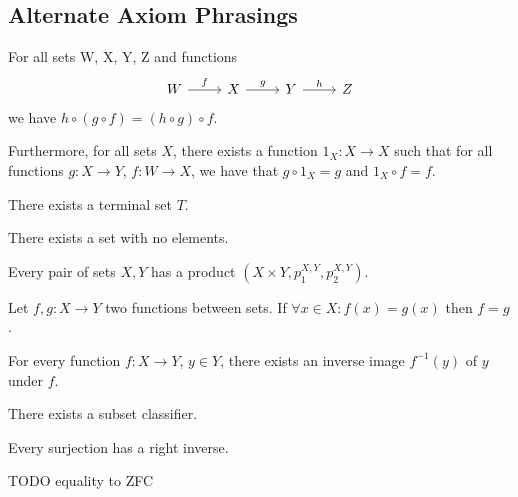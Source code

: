 \begin{appendix}

\section{Alternate Axiom Phrasings}

\setcounter{axiom}{0}


\begin{axiom}
For all sets W, X, Y, Z and functions
\begin{equation*}
\begin{tikzcd}
W \arrow[r,"f"] & X \arrow[r,"g"] & Y \arrow[r,"h"] & Z 
\end{tikzcd}
\end{equation*}
we have $h \circ (g \circ f) = (h \circ g) \circ f$. 

Furthermore, for all sets $X$, there exists a function $1_{X}: X \longrightarrow X$ such that for all functions $g: X \longrightarrow Y$, $f: W \longrightarrow X$, we have that $g \circ 1_{X} = g$ and $1_{X} \circ f = f$.
\end{axiom}

\begin{axiom}
There exists a terminal set $T$.
\end{axiom}

\begin{axiom}
There exists a set with no elements.
\end{axiom}

\begin{axiom}
Every pair of sets $X, Y$ has a product $(X \times Y, p_1^{X,Y}, p_2^{X,Y})$.
\end{axiom}

\begin{axiom}
Let $f,g: X \longrightarrow Y$ two functions between sets. If $\forall x \in X: f(x) = g(x)$ then $f = g$.
\end{axiom}

\begin{axiom}
For every function $f: X \longrightarrow Y$, $y \in Y$, there exists an inverse image $f^{-1}(y)$ of $y$ under $f$.
\end{axiom}

\begin{axiom}
There exists a subset classifier.
\end{axiom}

\begin{axiom}
Every surjection has a right inverse.
\end{axiom}

\begin{axiom}
TODO equality to ZFC
\end{axiom}


\end{appendix}


